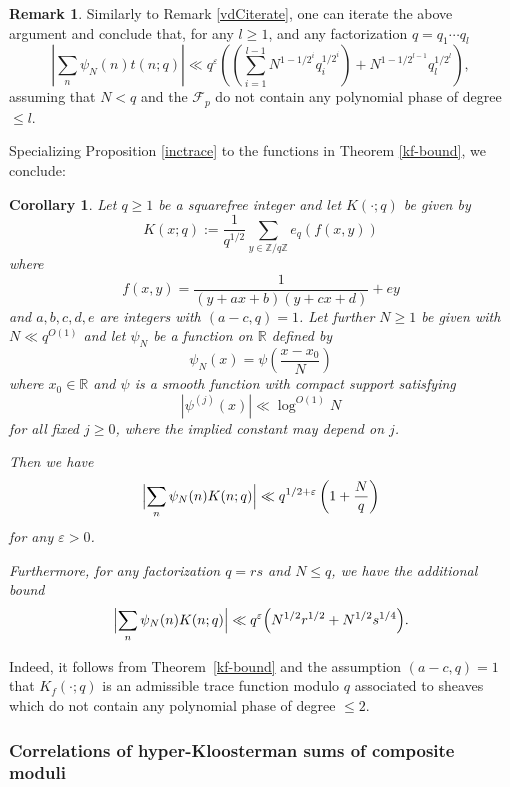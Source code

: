 \documentclass[12pt,a4paper,reqno]{amsart}
\numberwithin{equation}{section}
\theoremstyle{plain}
\newtheorem{corollary}[theorem]{Corollary}
\theoremstyle{definition}
\newtheorem{remark}[theorem]{Remark}
\newcommand\R{\mathbb{R}}
\newcommand\Z{\mathbb{Z}}
\newcommand\eps{\varepsilon}
\newcommand\mcF{\mathcal{F}}
\begin{document}
\begin{remark}\label{vdCiterate-trace} Similarly to Remark
  \ref{vdCiterate}, one can iterate the above argument and conclude
  that, for any $l \geq 1$, and any factorization $q = q_1 \cdots q_l$
$$
\left| \sum_n \psi_N(n) t(n;q) \right| \ll q^{\eps}\left(
\left(\sum_{i=1}^{l-1} N^{1-1/2^i} q_i^{1/2^i}\right) + N^{1-1/2^{l-1}}
q_l^{1/2^l}\right),
$$ 
assuming that $N<q$ and the $\mcF_p$ do not contain any polynomial
phase of degree $\leq l$.
\end{remark}

Specializing Proposition \ref{inctrace} to the functions in Theorem
\ref{kf-bound}, we conclude:

\begin{corollary}\label{inctrace-q} Let $q\geq 1$ be a squarefree
  integer and let $K(\cdot;q)$ be given by
$$
K(x;q):=\frac{1}{q^{1/2}} \sum_{y\in \Z/q\Z} e_q(f(x,y))
$$
where
$$
f(x,y)=\frac{1}{(y+ax+b)(y+cx+d)}+ey
$$
and $a,b,c,d,e$ are integers with $(a-c,q)=1$. 
Let further $N \geq 1$ be given with $N\ll q^{O(1)}$ and let $\psi_N$
be a function on $\R$ defined by
$$
\psi_N(x) = \psi\left(\frac{x-x_0}{N}\right)
$$
where $x_0\in \R$ and $\psi$ is a smooth function with compact support
satisfying
$$
|\psi^{(j)}(x)| \ll \log^{O(1)} N
$$
for all fixed $j \geq 0$, where the implied constant may depend on
$j$.
\par
Then we have
\begin{equation}\label{vdctrace-0-q}
  \Bigl|\sum_n \psi_N(n) K(n;q)\Bigr| 
  \ll q^{1/2+\eps}\left(1 + \frac{N}{q}\right)
\end{equation}
for any $\eps>0$.
\par
Furthermore, for any factorization $q = rs$ and $N \leq q$, we have the
additional bound
\begin{equation}\label{vdctrace-1-q}
  \Bigl|\sum_n \psi_N(n) K(n;q)\Bigr| \ll q^{\eps}\Bigl( N^{1/2}r^{1/2} +
  N^{1/2} s^{1/4}\Bigr).
\end{equation}
\end{corollary}

Indeed, it follows from Theorem~\ref{kf-bound} and the assumption
$(a-c,q)=1$ that $K_f(\cdot;q)$ is an admissible trace function modulo
$q$ associated to sheaves which do not contain any polynomial phase of
degree $\leq 2$.

\subsubsection{Correlations of hyper-Kloosterman sums of composite moduli}
\end{document}
